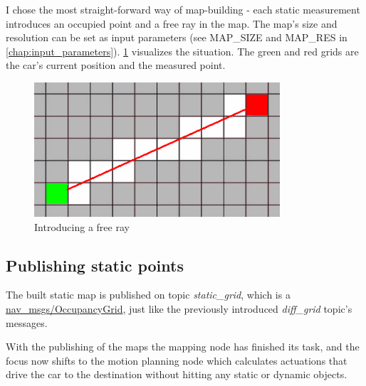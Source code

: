 I chose the most straight-forward way of map-building - each static measurement introduces an occupied point and a free ray in the map. The map's size and resolution can be set as input parameters (see MAP\_SIZE and MAP\_RES in \ref{chap:input_parameters}). \ref{map_ray} visualizes the situation. The green and red grids are the car's current position and the measured point.

\begin{figure}[!ht]
    \centering
    \includegraphics[height=50mm]{figures/raw/map_ray.png}
    \caption{Introducing a free ray}
    \label{map_ray}
\end{figure}

\subsection{Publishing static points}
\label{chap:publishing_static_points}
The built static map is published on topic \textit{static\_grid}, which is a \href{http://docs.ros.org/melodic/api/nav_msgs/html/msg/OccupancyGrid.html}{nav\_msgs/OccupancyGrid}, just like the previously introduced \textit{diff\_grid} topic's messages.

With the publishing of the maps the mapping node has finished its task, and the focus now shifts to the motion planning node which calculates actuations that drive the car to the destination without hitting any static or dynamic objects.